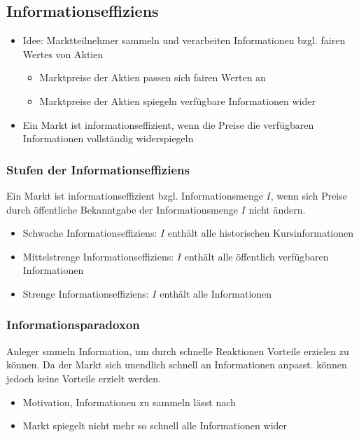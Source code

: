 \subsection{Informationseffiziens}
\begin{itemize}
	\item Idee: Marktteilnehmer sammeln und verarbeiten Informationen bzgl. fairen Wertes von Aktien
	\begin{itemize}
		\item Marktpreise der Aktien passen sich fairen Werten an
		\item Marktpreise der Aktien spiegeln verfügbare Informationen wider
	\end{itemize}
	\item Ein Markt ist informationseffizient, wenn die Preise die verfügbaren Informationen vollständig widerspiegeln
\end{itemize}

\subsubsection{Stufen der Informationseffiziens}
Ein Markt ist informationseffizient bzgl. Informationsmenge \(I\), wenn sich Preise durch öffentliche Bekanntgabe der Informationsmenge \(I\) nicht ändern.
\begin{itemize}
	\item Schwache Informationseffiziens: \(I\) enthält alle historischen Kursinformationen
	\item Mittelstrenge Informationseffiziens: \(I\) enthält alle öffentlich verfügbaren Informationen
	\item Strenge Informationseffiziens: \(I\) enthält alle Informationen
\end{itemize}

\subsubsection{Informationsparadoxon}
Anleger smmeln Information, um durch schnelle Reaktionen Vorteile erzielen zu können. Da der Markt sich unendlich schnell an Informationen anpasst. können jedoch keine Vorteile erzielt werden.
\begin{itemize}
	\item Motivation, Informationen zu sammeln lässt nach
	\item Markt spiegelt nicht mehr so schnell alle Informationen wider
\end{itemize}

